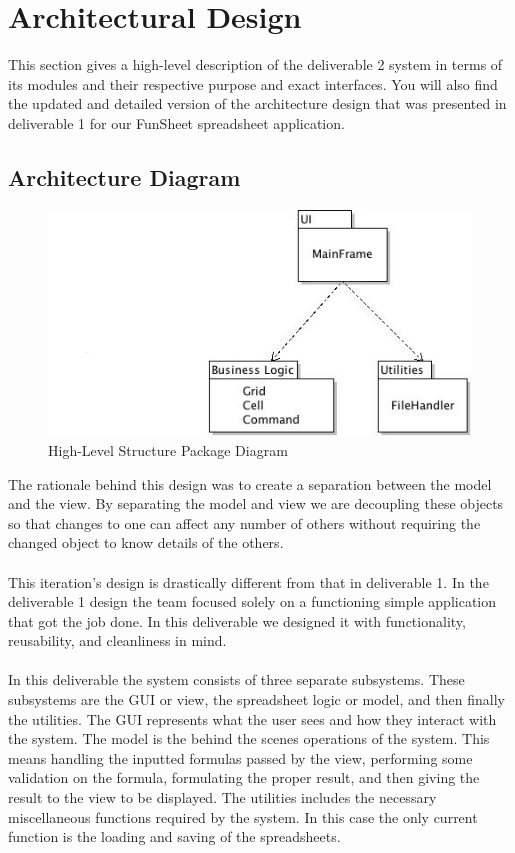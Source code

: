 \documentclass[12pt]{article}
\begin{document}
\section{Architectural Design}
This section gives a high-level description of the deliverable 2 system in terms of its modules and their respective purpose and exact interfaces. You will also find the updated and detailed version of the architecture design that was presented in deliverable 1 for our FunSheet spreadsheet application.
\subsection{Architecture Diagram}
\begin{figure}[htbp]
\includegraphics[scale=.7]{packagediagram.jpg}
\caption{High-Level Structure Package Diagram}
\label{fig:High-Level-Structure-Package-Diagram}
\end{figure}
The rationale behind this design was to create a separation between the model and the view. By separating the model and view we are decoupling these objects so that changes to one can affect any number of others without requiring the changed object to know details of the others.\\\\
This iteration's design is drastically different from that in deliverable 1. In the deliverable 1 design the team focused solely on a functioning simple application that got the job done. In this deliverable we designed it with functionality, reusability, and cleanliness in mind.\\\\
In this deliverable the system consists of three separate subsystems. These subsystems are the GUI or view, the spreadsheet logic or model, and then finally the utilities. The GUI represents what the user sees and how they interact with the system. The model is the behind the scenes operations of the system. This means handling the inputted formulas passed by the view, performing some validation on the formula, formulating the proper result, and then giving the result to the view to be displayed. The utilities includes the necessary miscellaneous functions required by the system. In this case the only current function is the loading and saving of the spreadsheets.
\end{document}
